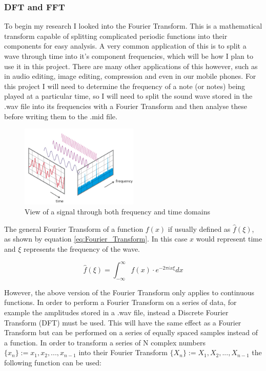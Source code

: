 \documentclass[12pt]{report}
\begin{document}
\subsubsection*{DFT and FFT}

To begin my research I looked into the Fourier Transform. This is a mathematical transform capable of splitting complicated periodic functions into their components for easy analysis. A very common application of this is to split a wave through time into it's component frequencies, which will be how I plan to use it in this project. There are many other applications of this however, such as in audio editing, image editing, compression and even in our mobile phones. For this project I will need to determine the frequency of a note (or notes) being played at a particular time, so I will need to split the sound wave stored in the .wav file into its frequencies with a Fourier Transform and then analyse these before writing them to the .mid file.

\begin{figure}[!ht]
	\centering
	\includegraphics[width=0.5\textwidth]{fourier.png}
	\caption{View of a signal through both frequency and time domains \cite{FFT}}
	\centering
	\label{label:fft_diagram}
\end{figure}

The general Fourier Transform of a function $f(x)$ if usually defined as $\hat{f}(\xi)$, as shown by equation \ref{eq:Fourier_Transform}. In this case $x$ would represent time and $\xi$ represents the frequency of the wave. 

\begin{equation}
    \hat{f}(\xi) = \int_{-\infty}^{\infty}f(x) \cdot e^{-2 \pi i x \xi} dx 
    \label{eq:Fourier_Transform}
\end{equation}


However, the above version of the Fourier Transform only applies to continuous functions. In order to perform a Fourier Transform on a series of data, for example the amplitudes stored in a .wav file, instead a Discrete Fourier Transform (DFT) must be used. This will have the same effect as a Fourier Transform but can be performed on a series of equally spaced samples instead of a function. In order to transform a series of N complex numbers $\{x_n\} := x_1, x_2,..., x_{n-1}$ into their Fourier Transform $\{X_n\} := X_1, X_2,..., X_{n-1}$ the following function can be used:
\end{document}
